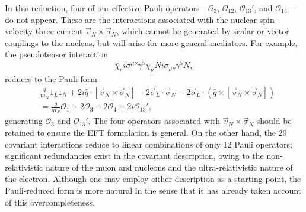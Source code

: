 \documentclass[12pt,letterpaper]{book}
\begin{document}
In this reduction, four of our effective Pauli operators---$\mathcal{O}_3$, $\mathcal{O}_{12}$, $\mathcal{O}_{13}'$, and $\mathcal{O}_{15}$---do not appear. These are the interactions associated with the nuclear spin-velocity three-current $\vec{v}_N\times\vec{\sigma}_N$, which cannot be generated by scalar or vector couplings to the nucleus, but will arise for more general mediators. For example, the pseudotensor interaction
\begin{equation}
\bar{\chi}_ei\sigma^{\mu\nu}\gamma^5\chi_{\mu}\bar{N}i\sigma_{\mu\nu}\gamma^5N,
\end{equation}
reduces to the Pauli form
\begin{equation}
\begin{split}
&\frac{q}{m_N}1_L1_N+2i\hat{q}\cdot\left[\vec{v}_N\times\vec{\sigma}_N\right]-2\vec{\sigma}_L\cdot\vec{\sigma}_N-2\vec{\sigma}_L\cdot\left(\hat{q}\times\left[\vec{v}_N\times\vec{\sigma}_N\right]\right)\\
&=\frac{q}{m_N}\mathcal{O}_1+2\mathcal{O}_3-2\mathcal{O}_4+2i\mathcal{O}_{13}',
\end{split}
\end{equation}
generating $\mathcal{O}_3$ and $\mathcal{O}_{13}'$. The four operators associated with $\vec{v}_N\times\vec{\sigma}_N$ should be retained to ensure the EFT formulation is general. On the other hand, the 20 covariant interactions reduce to linear combinations of only 12 Pauli operators; significant redundancies exist in the covariant description, owing to the non-relativistic nature of the muon and nucleons and the ultra-relativistic nature of the electron. Although one may employ either description as a starting point, the Pauli-reduced form is more natural in the sense that it has already taken account of this overcompleteness.
\end{document}
